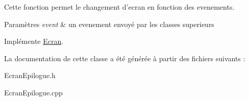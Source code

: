 \-Cette fonction permet le changement d'ecran en fonction des evenements. 


\begin{DoxyParams}{\-Paramètres}
{\em event} & un evenement envoyé par les classes superieurs \\
\hline
\end{DoxyParams}


\-Implémente \hyperlink{classEcran}{\-Ecran}.



\-La documentation de cette classe a été générée à partir des fichiers suivants \-:\begin{DoxyCompactItemize}
\item 
\-Ecran\-Epilogue.\-h\item 
\-Ecran\-Epilogue.\-cpp\end{DoxyCompactItemize}
